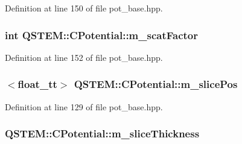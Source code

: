 Definition at line 150 of file pot\-\_\-base.\-hpp.

\hypertarget{class_q_s_t_e_m_1_1_c_potential_a2ab0972c9970e34c1e0d1bf37a9d86c8}{
\subsubsection[{m\-\_\-scat\-Factor}]{\setlength{\rightskip}{0pt plus 5cm}int Q\-S\-T\-E\-M\-::\-C\-Potential\-::m\-\_\-scat\-Factor\hspace{0.3cm}{\ttfamily [protected]}}}\label{class_q_s_t_e_m_1_1_c_potential_a2ab0972c9970e34c1e0d1bf37a9d86c8}


Definition at line 152 of file pot\-\_\-base.\-hpp.

\hypertarget{class_q_s_t_e_m_1_1_c_potential_ad44ace45b9cdf8aa02f01a8e6eaefff6}{
\subsubsection[{m\-\_\-slice\-Pos}]{$<${\bf float\-\_\-tt}$>$ Q\-S\-T\-E\-M\-::\-C\-Potential\-::m\-\_\-slice\-Pos\hspace{0.3cm}{\ttfamily [protected]}}}\label{class_q_s_t_e_m_1_1_c_potential_ad44ace45b9cdf8aa02f01a8e6eaefff6}


Definition at line 129 of file pot\-\_\-base.\-hpp.

\hypertarget{class_q_s_t_e_m_1_1_c_potential_a0a72848b6d447e0a7ba5143f7b302cc7}{
\subsubsection[{m\-\_\-slice\-Thickness}]{ Q\-S\-T\-E\-M\-::\-C\-Potential\-::m\-\_\-slice\-Thickness\hspace{0.3cm}{\ttfamily [protected]}}}\label{class_q_s_t_e_m_1_1_c_potential_a0a72848b6d447e0a7ba5143f7b302cc7}


